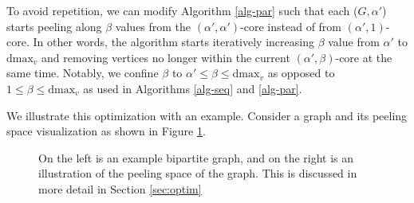 To avoid repetition, we can modify Algorithm \ref{alg-par} such that each ($G,\alpha'$) starts peeling along $\beta$ values from the $(\alpha',\alpha')$-core instead of from $(\alpha',1)$-core. In other words, the algorithm starts iteratively increasing $\beta$ value from $\alpha'$ to $\text{dmax}_v$ and removing vertices no longer within the current $(\alpha',\beta)$-core at the same time. Notably, we confine $\beta$ to $\alpha'\le\beta\le\text{dmax}_v$ as opposed to $1\le\beta\le\text{dmax}_v$ as used in Algorithms \ref{alg-seq} and \ref{alg-par}.

We illustrate this optimization with an example. Consider a graph and its peeling space visualization as shown in Figure \ref{fig:peel}.

\begin{figure}%
    \centering
    \qquad
    \caption{On the left is an example bipartite graph, and on the right is an illustration of the peeling space of the graph. This is discussed in more detail in Section \ref{sec:optim}}%
    \label{fig:peel}%
\end{figure}

